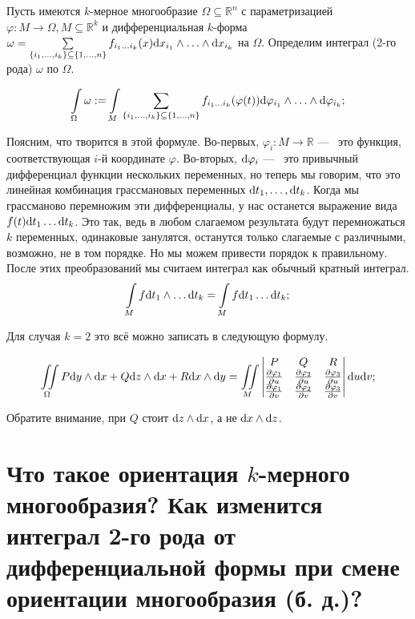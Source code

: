 \documentclass{article}
\begin{document}
	Пусть имеются $k$-мерное многообразие $\Omega \subseteq \mathbb{R}^n$ с параметризацией $\varphi: M \to \Omega, M \subseteq \mathbb{R}^k$ и дифференциальная $k$-форма $\omega = \sum\limits_{\{i_1, \ldots, i_k\} \subseteq \{1, \ldots, n\}} f_{i_1 \ldots i_k}(x)\mathrm{d} x_{i_1} \land \ldots \land \mathrm{d} x_{i_k}$ на $\Omega$. Определим интеграл (2-го рода) $\omega$ по $\Omega$.

	\[ \int\limits_\Omega \omega := \int\limits_M \sum_{\{i_1, \ldots, i_k\} \subseteq \{1, \ldots, n\}} f_{i_1 \ldots i_k} (\varphi(t)) \mathrm{d} \varphi_{i_1} \land \ldots \land \mathrm{d} \varphi_{i_k}; \]

	Поясним, что творится в этой формуле. Во-первых, $\varphi_i : M \to \mathbb{R}$ ---~ это функция, соответствующая $i$-й координате $\varphi$. Во-вторых, $\mathrm{d} \varphi_i$ ---~ это привычный дифференциал функции нескольких переменных, но теперь мы говорим, что это линейная комбинация грассмановых переменных $\mathrm{d} t_1, \ldots, \mathrm{d} t_k$. Когда мы грассманово перемножим эти дифференциалы, у нас останется выражение вида $f(t) \mathrm{d} t_1 \ldots \mathrm{d} t_k$. Это так, ведь в любом слагаемом результата будут перемножаться $k$ переменных, одинаковые занулятся, останутся только слагаемые с различными, возможно, не в том порядке. Но мы можем привести порядок к правильному. После этих преобразований мы считаем интеграл как обычный кратный интеграл.
\[\int\limits_M f \mathrm{d} t_1 \land \ldots \mathrm{d} t_k = \int\limits_M f \mathrm{d} t_1 \ldots \mathrm{d} t_k;  \]  

	Для случая $k = 2$ это всё можно записать в следующую формулу.

	\[\iint\limits_\Omega P\mathrm{d} y \land \mathrm{d} x + Q \mathrm{d} z \land \mathrm{d} x + R \mathrm{d} x \land \mathrm{d} y = \iint\limits_M \begin{vmatrix} P & Q & R \\ \frac{\partial \varphi_1}{\partial u} & \frac{\partial \varphi_2}{\partial u} & \frac{\partial \varphi_3}{\partial u} \\ \frac{\partial \varphi_1}{\partial v} & \frac{\partial \varphi_2}{\partial v} & \frac{\partial \varphi_3}{\partial v} \end{vmatrix} \mathrm{d} u \mathrm{d} v;\]

	Обратите внимание, при $Q$ стоит $\mathrm{d} z \land \mathrm{d} x$, а не $\mathrm{d} x \land \mathrm{d} z$. 

	\section{Что такое ориентация $k$-мерного многообразия? Как изменится интеграл 2-го рода от дифференциальной формы при смене ориентации многообразия (б. д.)?}
\end{document}
